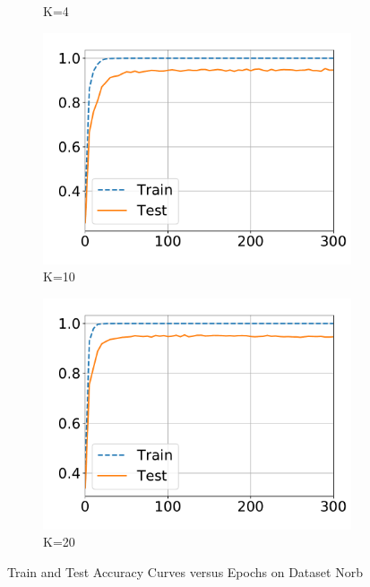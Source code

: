 \begin{figure}[!ht]
\begin{subfigure}{0.31\textwidth}
    \caption{K=4}
  \end{subfigure}
  \centering
  \begin{subfigure}{.31\textwidth}
    \centering
    \includegraphics[width=1\linewidth]{images/supply/train_curves/norb_10.pdf}
    \vspace{-0.8cm}
    \caption{K=10}
  \end{subfigure}
  \centering
  \begin{subfigure}{.31\textwidth}
    \centering
    \includegraphics[width=1\linewidth]{images/supply/train_curves/norb_20.pdf}
    \vspace{-0.8cm}
    \caption{K=20}
  \end{subfigure}
  \caption{Train and Test Accuracy Curves versus Epochs on Dataset Norb}
  \label{fig:class-norb}
\end{figure}


